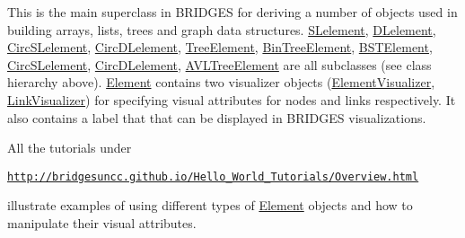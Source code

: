 This is the main superclass in B\+R\+I\+D\+G\+ES for deriving a number of objects used in building arrays, lists, trees and graph data structures. \mbox{\hyperlink{namespace_bridges_1_1_s_lelement}{S\+Lelement}}, \mbox{\hyperlink{namespace_bridges_1_1_d_lelement}{D\+Lelement}}, \mbox{\hyperlink{namespace_bridges_1_1_circ_s_lelement}{Circ\+S\+Lelement}}, \mbox{\hyperlink{namespace_bridges_1_1_circ_d_lelement}{Circ\+D\+Lelement}}, \mbox{\hyperlink{namespace_bridges_1_1_tree_element}{Tree\+Element}}, \mbox{\hyperlink{namespace_bridges_1_1_bin_tree_element}{Bin\+Tree\+Element}}, \mbox{\hyperlink{namespace_bridges_1_1_b_s_t_element}{B\+S\+T\+Element}}, \mbox{\hyperlink{namespace_bridges_1_1_circ_s_lelement}{Circ\+S\+Lelement}}, \mbox{\hyperlink{namespace_bridges_1_1_circ_d_lelement}{Circ\+D\+Lelement}}, \mbox{\hyperlink{namespace_bridges_1_1_a_v_l_tree_element}{A\+V\+L\+Tree\+Element}} are all subclasses (see class hierarchy above). \mbox{\hyperlink{class_bridges_1_1_element_1_1_element}{Element}} contains two visualizer objects (\mbox{\hyperlink{namespace_bridges_1_1_element_visualizer}{Element\+Visualizer}}, \mbox{\hyperlink{namespace_bridges_1_1_link_visualizer}{Link\+Visualizer}}) for specifying visual attributes for nodes and links respectively. It also contains a label that that can be displayed in B\+R\+I\+D\+G\+ES visualizations.

All the tutorials under

\href{http://bridgesuncc.github.io/Hello_World_Tutorials/Overview.html}{\tt http\+://bridgesuncc.\+github.\+io/\+Hello\+\_\+\+World\+\_\+\+Tutorials/\+Overview.\+html}

illustrate examples of using different types of \mbox{\hyperlink{class_bridges_1_1_element_1_1_element}{Element}} objects and how to manipulate their visual attributes.

